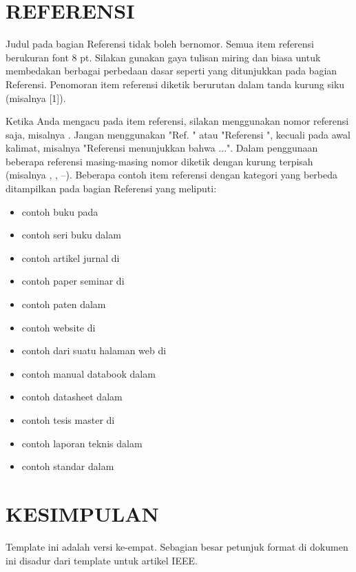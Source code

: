 \documentclass[10pt,twocolumn]{article}
\begin{document}
\section{\MakeUppercase{Referensi}}
Judul pada bagian Referensi tidak boleh bernomor. Semua item referensi berukuran font 8 pt. Silakan gunakan gaya tulisan miring dan biasa untuk membedakan berbagai perbedaan dasar seperti yang ditunjukkan pada bagian Referensi. Penomoran item referensi diketik berurutan dalam tanda kurung siku (misalnya [1]).

Ketika Anda mengacu pada item referensi, silakan menggunakan nomor referensi saja, misalnya \cite{metev1998}. Jangan menggunakan "Ref. \cite{breckling1989}" atau "Referensi \cite{zhang1999}", kecuali pada awal kalimat, misalnya "Referensi \cite{zhang1999} menunjukkan bahwa ...". Dalam penggunaan beberapa referensi masing-masing nomor diketik dengan kurung terpisah (misalnya \cite{metev1998}, \cite{breckling1989}, \cite{zhang1999}--\cite{shell2002}). Beberapa contoh item referensi dengan kategori yang berbeda ditampilkan pada bagian Referensi yang meliputi:
\begin{itemize}
\item contoh buku pada \cite{metev1998}
\item contoh seri buku dalam \cite{breckling1989}
\item contoh artikel jurnal di \cite{zhang1999}
\item contoh paper seminar di \cite{wegmuller2000}
\item contoh paten dalam \cite{sorace1997}
\item contoh website di \cite{ieee2002}
\item contoh dari suatu halaman web di \cite{shell2002}
\item contoh manual databook dalam \cite{flexchip1996}
\item contoh datasheet dalam \cite{pdca1999}
\item contoh tesis master di \cite{karnik1999}
\item contoh laporan teknis dalam \cite{padhye1999}
\item contoh standar dalam \cite{ieee8021997}
\end{itemize}

\section{\MakeUppercase{Kesimpulan}}
Template ini adalah versi ke-empat. Sebagian besar petunjuk format di dokumen ini disadur dari template untuk artikel IEEE.
\end{document}

